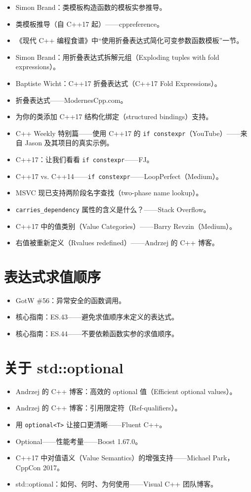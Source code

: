 \begin{itemize}
\item Simon Brand：类模板构造函数的模板实参推导。
\item 类模板推导（自 C++17 起）——cppreference。
\item 《现代 C++ 编程食谱》中“使用折叠表达式简化可变参数函数模板”一节。
\item Simon Brand：用折叠表达式拆解元组（Exploding tuples with fold expressions）。
\item Baptiste Wicht：C++17 折叠表达式（C++17 Fold Expressions）。
\item 折叠表达式——ModernesCpp.com。
\item 为你的类添加 C++17 结构化绑定（structured bindings）支持。
\item C++ Weekly 特别篇——使用 C++17 的 \texttt{if constexpr}（YouTube）——来自 Jason 及其项目的真实示例。
\item C++17：让我们看看 \texttt{if constexpr}——FJ。
\item C++17 vs. C++14——\texttt{if constexpr}——LoopPerfect（Medium）。
\item MSVC 现已支持两阶段名字查找（two-phase name lookup）。
\item \texttt{carries\_dependency} 属性的含义是什么？——Stack Overflow。
\item C++17 中的值类别（Value Categories）——Barry Revzin（Medium）。
\item 右值被重新定义（Rvalues redefined）——Andrzej 的 C++ 博客。
\end{itemize}

\section{表达式求值顺序}

\begin{itemize}
\item GotW \#56：异常安全的函数调用。
\item 核心指南：ES.43——避免求值顺序未定义的表达式。
\item 核心指南：ES.44——不要依赖函数实参的求值顺序。
\end{itemize}

\section{关于 std::optional}

\begin{itemize}
\item Andrzej 的 C++ 博客：高效的 optional 值（Efficient optional values）。
\item Andrzej 的 C++ 博客：引用限定符（Ref-qualifiers）。
\item 用 \texttt{optional<T>} 让接口更清晰——Fluent C++。
\item Optional——性能考量——Boost 1.67.0。
\item C++17 中对值语义（Value Semantics）的增强支持——Michael Park，CppCon 2017。
\item std::optional：如何、何时、为何使用——Visual C++ 团队博客。
\end{itemize}

